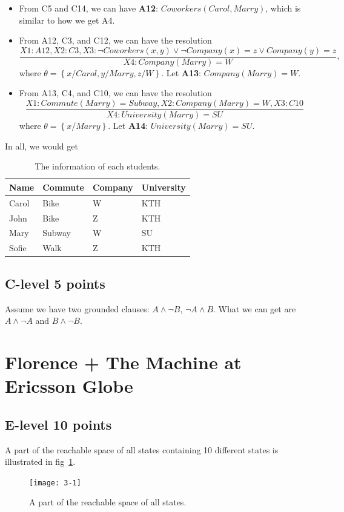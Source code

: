 \documentclass[11pt,a4paper]{article}
\begin{document}
\begin{itemize}
	\item From C5 and C14, we can have \textbf{A12}: $Coworkers(Carol, Marry)$, which is similar to how we get A4.
		
	\item From A12, C3, and C12, we can have the resolution
	$$
	\frac{X1: A12, X2: C3, X3: \lnot Coworkers(x, y) \vee \lnot Company(x) = z \vee Company(y) = z}{X4: Company(Marry) = W},
	$$
	where $\theta = \left\{ x/Carol, y/Marry, z/W \right\}$. Let \textbf{A13}: $Company(Marry) = W$.
	
	\item From A13, C4, and C10, we can have the resolution
	$$
	\frac{X1: Commute(Marry) = Subway, X2: Company(Marry) = W, X3: C10}{X4: University(Marry) = SU}
	$$
	where $\theta = \left\{ x/Marry \right\}$. Let \textbf{A14}: $University(Marry) = SU$.
\end{itemize}

\par In all, we would get
\begin{table}[!ht]
	\caption{The information of each students.}
	\label{tab:2.4}
	\centering
	\begin{tabular}{|l|l|l|l|}
	\hline
	Name 	& Commute 	& Company 	& University 	\\\hline\hline
	Carol 	& Bike		& W			& KTH			\\\hline
	John 	& Bike 		& Z 		& KTH 			\\\hline
	Mary 	& Subway 	& W 		& SU			\\\hline
	Sofie 	& Walk 		& Z 		& KTH 			\\\hline	
	\end{tabular}
\end{table}

\subsection{C-level 5 points}
\par Assume we have two grounded clauses: $A \wedge \lnot B$, $\lnot A \wedge B$. What we can get are $A \wedge \lnot A$ and $B \wedge \lnot B$.


\section{Florence + The Machine at Ericsson Globe}
\subsection{E-level 10 points}
\label{3-1}
\par A part of the reachable space of all states containing 10 different states is illustrated in fig~\ref{fig:3-1}.
\begin{figure}[!htbp]
	\footnotesize
	\centering
	\texttt{[image: 3-1]}
	\caption{A part of the reachable space of all states.}
	\label{fig:3-1}
\end{figure}
\end{document}
